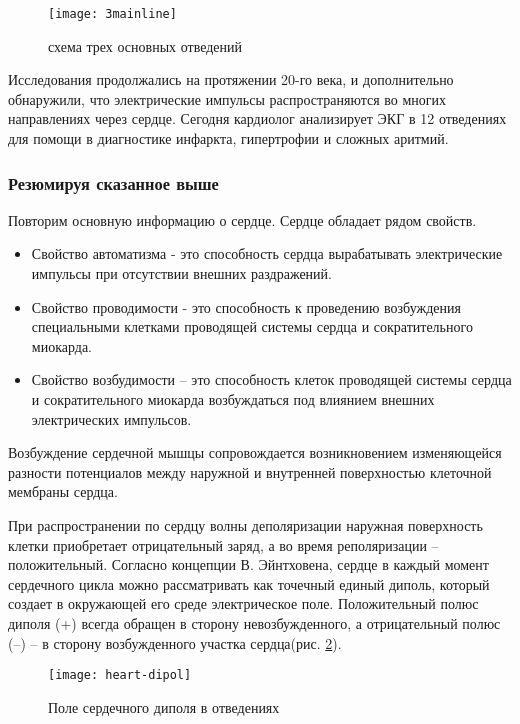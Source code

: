 \begin{figure}[h!]	
	\begin{center}
		\texttt{[image: 3mainline]}
		\caption{схема трех основных отведений}
		\label{ris:3mainline}
	\end{center}
\end{figure}

Исследования продолжались на протяжении 20-го века, и дополнительно обнаружили, что электрические импульсы распространяются во многих направлениях через сердце. Сегодня кардиолог анализирует ЭКГ в 12 отведениях для помощи в диагностике инфаркта, гипертрофии и сложных аритмий.


\subsubsection{Резюмируя сказанное выше}

Повторим основную информацию о сердце.
Сердце обладает рядом свойств.

\begin{itemize}
	\item Свойство автоматизма - это способность сердца вырабатывать электрические импульсы при отсутствии внешних раздражений.
	\item Свойство проводимости - это способность к проведению возбуждения специальными клетками проводящей системы сердца и сократительного миокарда.
	\item Свойство возбудимости – это способность клеток проводящей системы сердца и сократительного миокарда возбуждаться под влиянием внешних электрических импульсов.
\end{itemize}

Возбуждение сердечной мышцы сопровождается возникновением изменяющейся разности потенциалов между наружной и внутренней поверхностью клеточной мембраны сердца.

При распространении по сердцу волны деполяризации наружная поверхность клетки приобретает отрицательный заряд, а во время реполяризации – положительный. Согласно концепции В. Эйнтховена, сердце в каждый момент сердечного цикла можно рассматривать как точечный единый диполь, который создает в окружающей его среде электрическое поле. Положительный полюс диполя (+) всегда обращен в сторону невозбужденного, а отрицательный полюс (–) – в сторону возбужденного участка сердца(рис. \ref{ris:dipol}).

\begin{figure}[h!]
	\begin{center}
		\texttt{[image: heart-dipol]}
		\caption{Поле сердечного диполя в отведениях}
		\label{ris:dipol}
	\end{center}
\end{figure}


